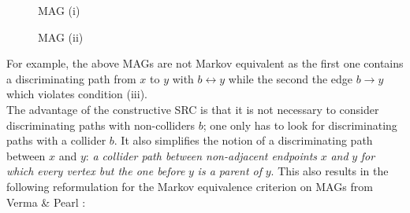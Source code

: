 \documentclass[a4paper]{article}
\begin{document}
\begin{multicols}{2}
	\begin{minipage}{\linewidth}
		\begin{figure}[H]
			\centering
			\caption{MAG (i)}
			\label{fig:mag-csrc1}
		\end{figure}
	\end{minipage}
	
	\columnbreak
	
	\begin{minipage}{\linewidth}
		\begin{figure}[H]
			\centering
			\caption{MAG (ii)}
			\label{fig:mag-csrc2}
		\end{figure}
	\end{minipage}
\end{multicols}
For example, the above MAGs are not Markov equivalent as the first one contains a discriminating path from $x$ to $y$ with $b \leftrightarrow y$ while the second the edge $b \rightarrow y$ which violates condition (iii). \\

The advantage of the constructive SRC is that it is not necessary to consider discriminating paths with non-colliders $b$; one only has to look for discriminating paths with a collider $b$. It also simplifies the notion of a discriminating path between $x$ and $y$: \textit{a collider path between non-adjacent endpoints} $x$ \textit{and} $y$ \textit{for which every vertex but the one before} $y$ \textit{is a parent of} $y$. This also results in the following reformulation for the Markov equivalence criterion on MAGs from Verma \& Pearl \cite{verma1990}:
\end{document}

